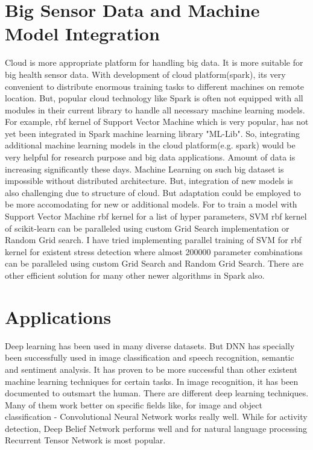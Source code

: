 \documentclass[conference]{IEEEtran}
\begin{document}
\section{Big Sensor Data and Machine  Model Integration}
Cloud is more appropriate platform for handling big data. It is more suitable for big health sensor data. With development of cloud platform(spark), its very convenient to distribute enormous training tasks to different machines on remote location. But, popular cloud technology like Spark is often not equipped with all modules in their current library to handle all necessary machine learning models. For example, rbf kernel of Support Vector Machine which is very popular, has not yet been integrated in Spark machine learning library "ML-Lib". So, integrating additional machine learning models in the cloud platform(e.g. spark) would be very helpful for research purpose and big data applications. Amount of data is increasing significantly these days. Machine Learning on such big dataset is impossible without distributed architecture. But, integration of new models is also challenging due to structure of cloud. But adaptation could be employed to be more accomodating for new or additional models. For to train a model with Support Vector Machine rbf kernel for a list of hyper parameters, SVM rbf kernel of scikit-learn can be paralleled using custom Grid Search implementation or Random Grid search. I have tried implementing parallel training of SVM for rbf kernel for existent stress detection where almost 200000 parameter combinations can be paralleled using custom Grid  Search and Random Grid Search. There are other efficient solution for many other newer algorithms in Spark also.
\section{Applications}
Deep learning has been used in many diverse datasets. But DNN has specially been successfully used in image classification and speech recognition, semantic and sentiment analysis. It has proven to be more successful than other existent machine learning techniques for certain tasks. In image recognition, it has been documented to outsmart the human. There are different deep learning techniques. Many of them work better on specific fields like, for image and object classification - Convolutional Neural Network works really well. While for activity detection, Deep Belief Network performs well and for natural language processing Recurrent Tensor Network is most popular.
\end{document}
